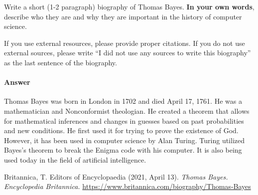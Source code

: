 \documentclass{article}
\begin{document}
\collab{\todo{}}

Write a short (1-2 paragraph) biography of Thomas Bayes.
\textbf{In your own words}, describe who they are and why they are important in
the history of computer science.

If you use external resources, please provide
proper citations. If you do not use external sources, please write ``I did not
use any sources to write this biography'' as the last sentence of the
biography.

\paragraph{Answer}

Thomas Bayes was born in London in 1702 and died April 17, 1761. He was a mathematician and Nonconformist theologian.
He created a theorem that allows for mathematical inferences and changes in guesses based on past probabilities and new conditions. He first used it for trying to prove the existence of God. However, it has been used in computer science by Alan Turing. Turing utilized Bayes's theorem to break the Enigma code with his computer. It is also being used today in the field of artificial intelligence.

Britannica, T. Editors of Encyclopaedia (2021, April 13). \textit{Thomas Bayes. Encyclopedia Britannica.} \url{https://www.britannica.com/biography/Thomas-Bayes}

% 
% 
\end{document}
